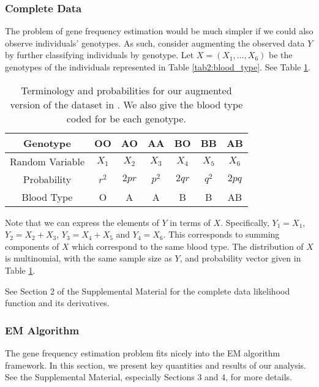 \documentclass[ss]{imsart}
\theoremstyle{plain}
\theoremstyle{definition}
\theoremstyle{remark}
\begin{document}
\subsubsection{Complete Data}

The problem of gene frequency estimation would be much simpler if we could also observe individuals' genotypes. As such, consider augmenting the observed data $Y$ by further classifying individuals by genotype. Let $X = (X_1, \ldots, X_6)$ be the genotypes of the individuals represented in Table \ref{tab2:blood_type}. See Table \ref{tab2:blood_type_complete}.

\begin{table}
    \centering
    \caption{Terminology and probabilities for our augmented version of the dataset in \citet{Fuj78}. We also give the blood type coded for be each genotype.}
    \begin{tabular}{c|cccccc}
        Genotype & OO & AO & AA & BO & BB & AB\\
        \hline
        Random Variable & $X_1$ & $X_2$ & $X_3$ & $X_4$ & $X_5$ & $X_6$\\
        Probability & $r^2$ & $2pr$ & $p^2$ & $2qr$ & $q^2$ & $2pq$\\
        Blood Type & O & A & A & B & B & AB
    \end{tabular}
    
    \label{tab2:blood_type_complete}
\end{table}

Note that we can express the elements of $Y$ in terms of $X$. Specifically, $Y_1 = X_1$, $Y_2 = X_2 + X_3$, $Y_3 = X_4 + X_5$ and $Y_4 = X_6$. This corresponds to summing components of $X$ which correspond to the same blood type. The distribution of $X$ is multinomial, with the same sample size as $Y$, and probability vector given in Table \ref{tab2:blood_type_complete}.

See Section 2 of the Supplemental Material for the complete data likelihood function and its derivatives.

\subsubsection{EM Algorithm}

The gene frequency estimation problem fits nicely into the EM algorithm framework. In this section, we present key quantities and results of our analysis. See the Supplemental Material, especially Sections 3 and 4, for more details.
\end{document}
